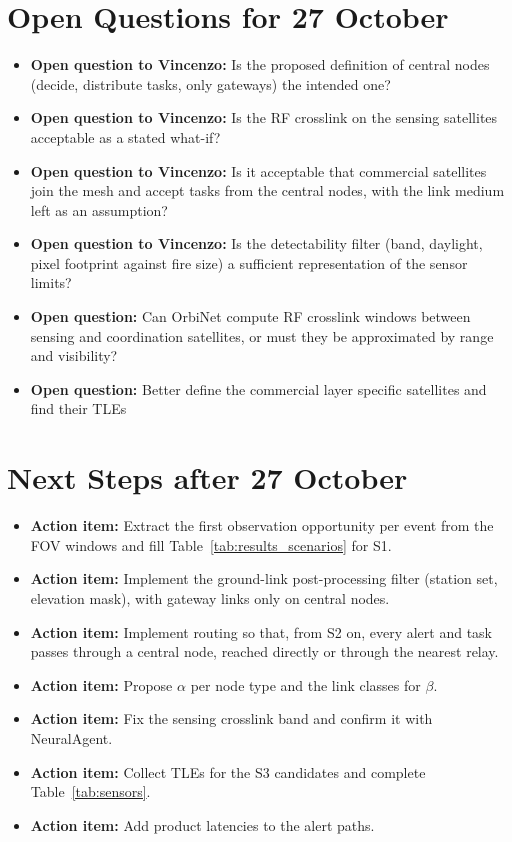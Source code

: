 \documentclass[11pt]{article}
\newcommand{\openquestion}[1]{\textcolor{openq}{\textbf{Open question:}} #1}
\newcommand{\vincenzoq}[1]{\textcolor{vincenzoq}{\textbf{Open question to Vincenzo:}} #1}
\newcommand{\actionitem}[1]{\textcolor{todo}{\textbf{Action item:}} #1}
\begin{document}
\section{Open Questions for 27 October}\label{sec:open20oct}

\begin{itemize}[leftmargin=1.2cm]
    \item \vincenzoq{Is the proposed definition of central nodes (decide, distribute tasks, only gateways) the intended one?}
    \item \vincenzoq{Is the RF crosslink on the sensing satellites acceptable as a stated what-if?}
    \item \vincenzoq{Is it acceptable that commercial satellites join the mesh and accept tasks from the central nodes, with the link medium left as an assumption?}
    \item \vincenzoq{Is the detectability filter (band, daylight, pixel footprint against fire size) a sufficient representation of the sensor limits?}
    \item \openquestion{Can OrbiNet compute RF crosslink windows between sensing and coordination satellites, or must they be approximated by range and visibility?}
    \item \openquestion{Better define the commercial layer specific satellites and find their TLEs}
\end{itemize}

\section{Next Steps after 27 October}\label{sec:next20oct}

\begin{itemize}[leftmargin=1.2cm]
    \item \actionitem{Extract the first observation opportunity per event from the FOV windows and fill Table~\ref{tab:results_scenarios} for S1.}
    \item \actionitem{Implement the ground-link post-processing filter (station set, elevation mask), with gateway links only on central nodes.}
    \item \actionitem{Implement routing so that, from S2 on, every alert and task passes through a central node, reached directly or through the nearest relay.}
    \item \actionitem{Propose $\alpha$ per node type and the link classes for $\beta$.}
    \item \actionitem{Fix the sensing crosslink band and confirm it with NeuralAgent.}
    \item \actionitem{Collect TLEs for the S3 candidates and complete Table~\ref{tab:sensors}.}
    \item \actionitem{Add product latencies to the alert paths.}
\end{itemize}

\printbibliography
\end{document}
